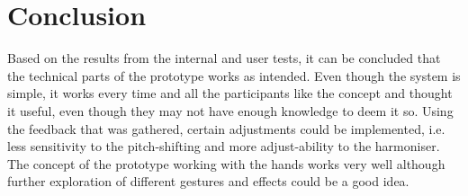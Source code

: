 \section{Conclusion}
Based on the results from the internal and user tests, it can be concluded that the technical parts of the prototype works as intended. Even though the system is simple, it works every time and all the participants like the concept and thought it useful, even though they may not have enough knowledge to deem it so. Using the feedback that was gathered, certain adjustments could be implemented, i.e. less sensitivity to the pitch-shifting and more adjust-ability to the harmoniser. The concept of the prototype working with the hands works very well although further exploration of different gestures and effects could be a good idea. 


